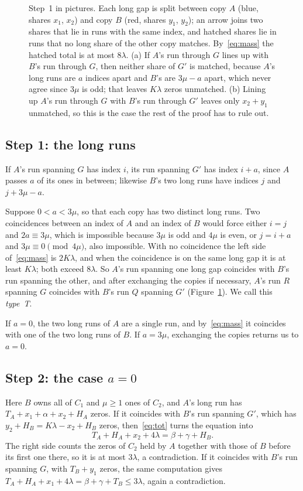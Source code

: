 \documentclass[12pt]{article}
\begin{document}
\begin{figure}[ht]
\begin{tikzpicture}[x=0.42cm,y=0.42cm,font=\small]
\end{tikzpicture}
\caption{Step~1 in pictures. Each long gap is split between copy $A$ (blue, shares $x_1$, $x_2$) and copy $B$ (red, shares $y_1$, $y_2$); an arrow joins two shares that lie in runs with the same index, and hatched shares lie in runs that no long share of the other copy matches. By~\eqref{eq:mass} the hatched total is at most $8\lambda$. (a) If $A$'s run through $G$ lines up with $B$'s run through $G$, then neither share of $G'$ is matched, because $A$'s long runs are $a$ indices apart and $B$'s are $3\mu-a$ apart, which never agree since $3\mu$ is odd; that leaves $K\lambda$ zeros unmatched. (b) Lining up $A$'s run through $G$ with $B$'s run through $G'$ leaves only $x_2+y_1$ unmatched, so this is the case the rest of the proof has to rule out.}
\label{fig:longruns}
\end{figure}

\subsection{Step 1: the long runs}
If $A$'s run spanning $G$ has index $i$, its run spanning $G'$ has index $i + a$, since $A$ passes $a$ of its
ones in between; likewise $B$'s two long runs have indices $j$ and $j + 3\mu - a$.

Suppose $0 < a < 3\mu$, so that each copy has two distinct long runs. Two coincidences between an index of $A$
and an index of $B$ would force either $i = j$ and $2a \equiv 3\mu$, which is impossible because $3\mu$ is
odd and $4\mu$ is even, or $j = i + a$ and $3\mu \equiv 0 \pmod{4\mu}$, also impossible. With no coincidence
the left side of~\eqref{eq:mass} is $2K\lambda$, and when the coincidence is on the same long gap it is at
least $K\lambda$; both exceed $8\lambda$. So $A$'s run spanning one long gap coincides with $B$'s run spanning
the other, and after exchanging the copies if necessary, $A$'s run $R$ spanning $G$ coincides with $B$'s run
$Q$ spanning $G'$ (Figure~\ref{fig:longruns}). We call this \emph{type~T}.

If $a = 0$, the two long runs of $A$ are a single run, and by~\eqref{eq:mass} it coincides with one of the two
long runs of $B$. If $a = 3\mu$, exchanging the copies returns us to $a = 0$.

\subsection{Step 2: the case $a = 0$}
Here $B$ owns all of $C_1$ and $\mu \ge 1$ ones of $C_2$, and $A$'s long run has $T_A + x_1 + \alpha + x_2 +
H_A$ zeros. If it coincides with $B$'s run spanning $G'$, which has $y_2 + H_B = K\lambda - x_2 + H_B$ zeros,
then~\eqref{eq:tot} turns the equation into
\[
T_A + H_A + x_2 + 4\lambda = \beta + \gamma + H_B .
\]
The right side counts the zeros of $C_2$ held by $A$ together with those of $B$ before its first one
there, so it is at most $3\lambda$, a contradiction. If it coincides with $B$'s run spanning $G$, with $T_B + y_1$ zeros, the same
computation gives $T_A + H_A + x_1 + 4\lambda = \beta + \gamma + T_B \le 3\lambda$, again a contradiction.
\end{document}
